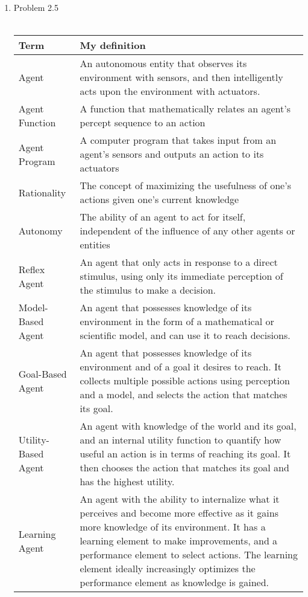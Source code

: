 \documentclass[10pt]{article}
\begin{document}
\begin{enumerate}
\item Problem 2.5 \\ \\
  \begin{tabular}{|L|K|}
    \hline
    \textbf{Term} & \textbf{My definition} \\
    \hline
    Agent & An autonomous entity that observes its environment with sensors, and then intelligently acts upon the environment with actuators. \\
    \hline
    Agent Function & A function that mathematically relates an agent's percept sequence to an action \\
    \hline
    Agent Program & A computer program that takes input from an agent's sensors and outputs an action to its actuators \\
    \hline
    Rationality & The concept of maximizing the usefulness of one's actions given one's current knowledge \\
    \hline
    Autonomy & The ability of an agent to act for itself, independent of the influence of any other agents or entities \\
    \hline
    Reflex Agent & An agent that only acts in response to a direct stimulus, using only its immediate perception of the stimulus to make a decision. \\
    \hline
    Model-Based Agent & An agent that possesses knowledge of its environment in the form of a mathematical or scientific model, and can use it to reach decisions. \\
    \hline
    Goal-Based Agent & An agent that possesses knowledge of its environment and of a goal it desires to reach. It collects multiple possible actions using perception and a model, and selects the action that matches its goal. \\
    \hline
    Utility-Based Agent & An agent with knowledge of the world and its goal, and an internal utility function to quantify how useful an action is in terms of reaching its goal. It then chooses the action that matches its goal and has the highest utility. \\
    \hline
    Learning Agent & An agent with the ability to internalize what it perceives and become more effective as it gains more knowledge of its environment. It has a learning element to make improvements, and a performance element to select actions. The learning element ideally increasingly optimizes the performance element as knowledge is gained. \\
    \hline
  \end{tabular}
\end{enumerate}
\end{document}
